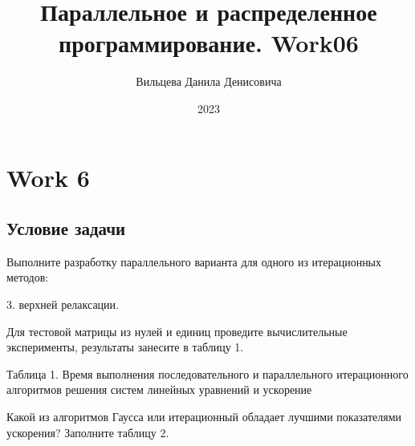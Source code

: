 \documentclass[bachelor, och, referat]{SCWorks}
\begin{document}
\title{Параллельное и распределенное программирование. Work06}
\author{Вильцева Данила Денисовича}


\date{2023}

\maketitle
\tableofcontents



\section{Work 6}
\subsection{Условие задачи}
Выполните разработку параллельного варианта для одного из итерационных методов:

3. верхней релаксации.

Для тестовой матрицы из нулей и единиц проведите вычислительные эксперименты, результаты занесите в таблицу 1.

Таблица 1. Время выполнения последовательного и параллельного итерационного алгоритмов решения систем линейных уравнений и ускорение
\begin{figure}[h]
\end{figure}

Какой из алгоритмов Гаусса или итерационный обладает лучшими показателями ускорения? Заполните таблицу 2.
\end{document}
